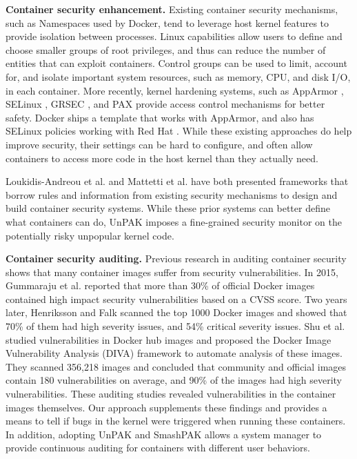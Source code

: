 \textbf{Container security enhancement.} 
Existing container security mechanisms, such as Namespaces \cite{namespaces} used by Docker, tend to leverage host kernel features to provide isolation between processes. 
Linux capabilities \cite{linux-kernel-capabilities} allow users to define and choose smaller groups of root privileges, and thus can reduce the number of entities that can exploit  containers. 
Control groups \cite{cgroups} can be used to limit, account for, and isolate important system resources, such as memory, CPU, and disk I/O, in  each container. 
More recently, kernel hardening systems,  such as AppArmor \cite{AppArmor}, SELinux \cite{SELinux}, GRSEC \cite{GRSEC}, and PAX \cite{PAX} provide access control mechanisms for better safety. 
Docker ships a template that works with AppArmor, and also has SELinux policies working with Red Hat \cite{red-hat}. 
While these existing approaches do help improve security, their settings can be hard to configure, and often allow containers to access more code in the host kernel than they actually need. 

Loukidis-Andreou et al. \cite{8416432} and Mattetti et al. \cite{7346869} have both presented frameworks that borrow rules and information from existing security mechanisms to design 
and build container security systems. While these prior systems can better define what containers can do,
UnPAK imposes a fine-grained security monitor on the potentially risky unpopular kernel code. 

\textbf{Container security auditing.} 
Previous research  in  auditing container security shows that many container images suffer from security vulnerabilities. 
In 2015, Gummaraju et al. \cite{Gummaraju} reported that more than 30\% of official Docker images contained high impact security vulnerabilities based on a CVSS score. 
Two years later, Henriksson and Falk \cite{Henriksson} scanned the top 1000 Docker images and showed that 70\% of them had high severity issues, and 54\% critical severity issues. 
Shu et al. \cite{Shu} studied vulnerabilities in Docker hub images and proposed the Docker Image Vulnerability Analysis (DIVA) framework to automate analysis of these images. 
They scanned 356,218 images and concluded that community and official images contain 180 vulnerabilities on average, and 90\% of the images had high severity vulnerabilities. 
These auditing studies revealed vulnerabilities in the container images themselves. 
Our approach supplements these findings and provides a means to tell if bugs in the kernel were triggered when running these containers. 
In addition, adopting UnPAK and SmashPAK allows a system manager to provide continuous auditing for containers with different user behaviors. 